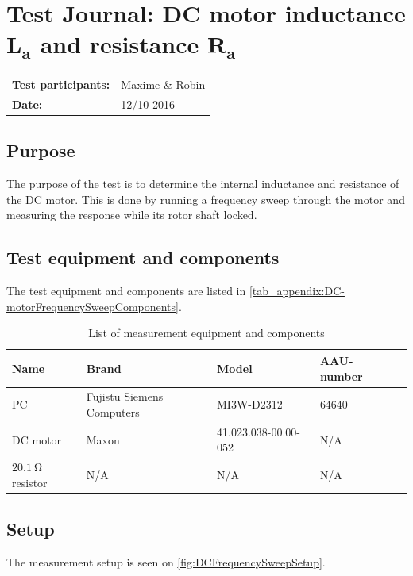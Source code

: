 \chapter{Test Journal: DC motor inductance $\boldsymbol{L_a}$ and resistance $\boldsymbol{R_a}$}
\label{test:DC-motorFrequencySweep}
\begin{table}[!h]
\begin{tabular}{l l}
\textbf{Test participants:} & Maxime \& Robin  \\
\textbf{Date:}  & 12/10-2016
\end{tabular}
\end{table}

\section*{Purpose}
The purpose of the test is to determine the internal inductance and resistance of the DC motor. This is done by running a frequency sweep through the motor and measuring the response while its rotor shaft locked.

\section*{Test equipment and components}
The test equipment and components are listed in \autoref{tab_appendix:DC-motorFrequencySweepComponents}.
\begin{table}[h]
	\centering
	\caption{List of measurement equipment and components}\label{tab_appendix:DC-motorFrequencySweepComponents}

	\begin{tabularx}{\textwidth}{l X X X X}
		Name 				& Brand	& Model & AAU-number\\ \toprule \rowcolor{lightGrey}
		PC & Fujistu Siemens Computers & MI3W-D2312 & 64640 \\
		DC motor & Maxon & 41.023.038-00.00-052& N/A \\ \rowcolor{lightGrey}
		$\SI{20.1}{\ohm}$ resistor & N/A & N/A & N/A \\
	\end{tabularx}
\end{table}

\section*{Setup}
The measurement setup is seen on \autoref{fig:DCFrequencySweepSetup}.

